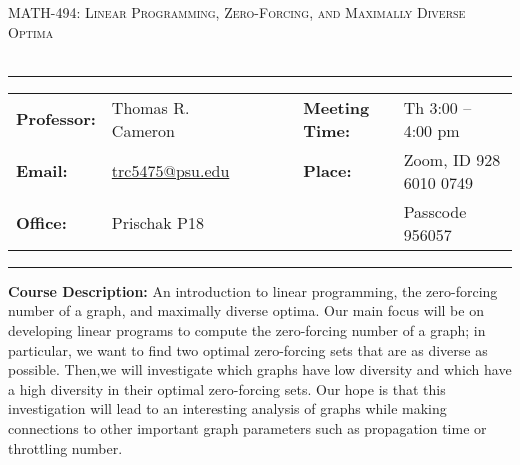 \documentclass[11pt]{article}
\begin{document}
{\large \textsc{MATH-494: Linear Programming, Zero-Forcing, and Maximally Diverse Optima}}\\
\\

\begin{center}
\rule{7in}{0.4pt}
\begin{minipage}[t]{.75\textwidth}
\begin{tabular}{llcccll}
\textbf{Professor:} & Thomas R. Cameron & & &  & \textbf{Meeting Time:} &Th 3:00 -- 4:00 pm\\
\textbf{Email:} &  \href{mailto:trc5475@psu.edu}{trc5475@psu.edu} & & & & \textbf{Place:} & Zoom, ID 928 6010 0749 \\ \textbf{Office:} & Prischak P18 & & & & & Passcode 956057
\end{tabular}
\end{minipage}
\rule{7in}{0.4pt}
\end{center}
\vspace{.5cm}
\setlength{\unitlength}{1in}
\renewcommand{\arraystretch}{2}

\vspace*{.10in}
\noindent\textbf{Course Description:}
An introduction to linear programming, the zero-forcing number of a graph, and maximally diverse optima. 
Our main focus will be on developing linear programs to compute the zero-forcing number of a graph; in particular, we want to find two optimal zero-forcing sets that are as diverse as possible. 
Then,we will investigate which graphs have low diversity and which have a high diversity in their optimal zero-forcing sets. 
Our hope is that this investigation will lead to an interesting analysis of graphs while making connections to other important graph parameters such as propagation time or throttling number.
\end{document}
